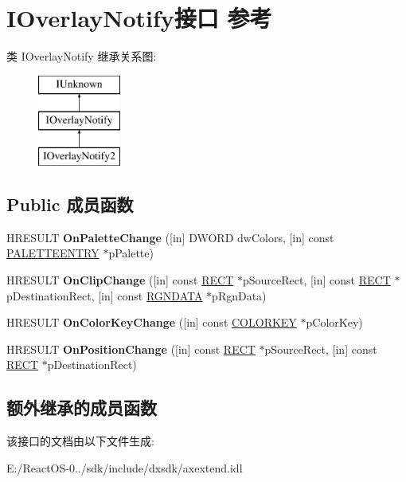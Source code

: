 \hypertarget{interface_i_overlay_notify}{}\section{I\+Overlay\+Notify接口 参考}
\label{interface_i_overlay_notify}
类 I\+Overlay\+Notify 继承关系图\+:\begin{figure}[H]
\begin{center}
\leavevmode
\includegraphics[height=3.000000cm]{interface_i_overlay_notify}
\end{center}
\end{figure}
\subsection*{Public 成员函数}
\begin{DoxyCompactItemize}
\item 
\mbox{\label{interface_i_overlay_notify_a9b700c47c4f8f2f015d0d47b34c76784}} 
H\+R\+E\+S\+U\+LT {\bfseries On\+Palette\+Change} (\mbox{[}in\mbox{]} D\+W\+O\+RD dw\+Colors, \mbox{[}in\mbox{]} const \hyperlink{structtag_p_a_l_e_t_t_e_e_n_t_r_y}{P\+A\+L\+E\+T\+T\+E\+E\+N\+T\+RY} $\ast$p\+Palette)
\item 
\mbox{\label{interface_i_overlay_notify_a3381ae3c5b11b2cca245f027afe74fa3}} 
H\+R\+E\+S\+U\+LT {\bfseries On\+Clip\+Change} (\mbox{[}in\mbox{]} const \hyperlink{structtag_r_e_c_t}{R\+E\+CT} $\ast$p\+Source\+Rect, \mbox{[}in\mbox{]} const \hyperlink{structtag_r_e_c_t}{R\+E\+CT} $\ast$p\+Destination\+Rect, \mbox{[}in\mbox{]} const \hyperlink{struct___r_g_n_d_a_t_a}{R\+G\+N\+D\+A\+TA} $\ast$p\+Rgn\+Data)
\item 
\mbox{\label{interface_i_overlay_notify_a39f90bd49a7740c22490480a74cc145f}} 
H\+R\+E\+S\+U\+LT {\bfseries On\+Color\+Key\+Change} (\mbox{[}in\mbox{]} const \hyperlink{structtag_c_o_l_o_r_k_e_y}{C\+O\+L\+O\+R\+K\+EY} $\ast$p\+Color\+Key)
\item 
\mbox{\label{interface_i_overlay_notify_abecf059fa5b507cc21862f1b79ac65db}} 
H\+R\+E\+S\+U\+LT {\bfseries On\+Position\+Change} (\mbox{[}in\mbox{]} const \hyperlink{structtag_r_e_c_t}{R\+E\+CT} $\ast$p\+Source\+Rect, \mbox{[}in\mbox{]} const \hyperlink{structtag_r_e_c_t}{R\+E\+CT} $\ast$p\+Destination\+Rect)
\end{DoxyCompactItemize}
\subsection*{额外继承的成员函数}


该接口的文档由以下文件生成\+:\begin{DoxyCompactItemize}
\item 
E\+:/\+React\+O\+S-\/0../sdk/include/dxsdk/axextend.\+idl\end{DoxyCompactItemize}
